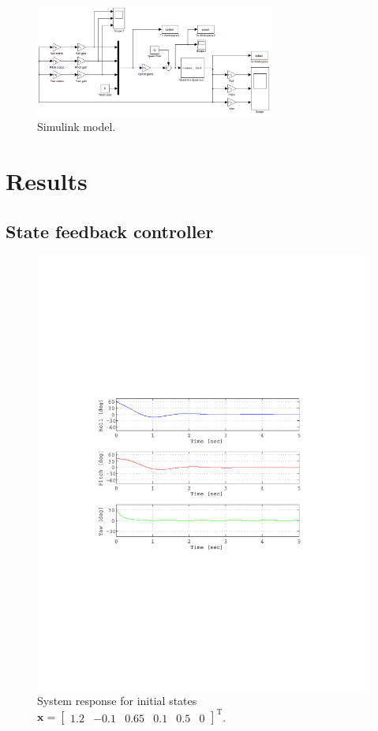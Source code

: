 \documentclass[12pt]{article}
\begin{document}
\begin{figure}
  \centering
  \includegraphics[width=0.7\textwidth]{Simulink.png}
  \caption{Simulink model.}
  \label{fig:model}
\end{figure}

\section{Results}

\subsection{State feedback controller}

\begin{figure}
  \centering
  \includegraphics{state-feedback.pdf}
  \caption{System response for initial states $\mathbf{x} = \begin{bmatrix} 1.2 & -0.1 & 0.65 & 0.1 & 0.5 & 0 \end{bmatrix}^\mathrm{T} $.}
  \label{fig:res-sf}
\end{figure}
\end{document}
